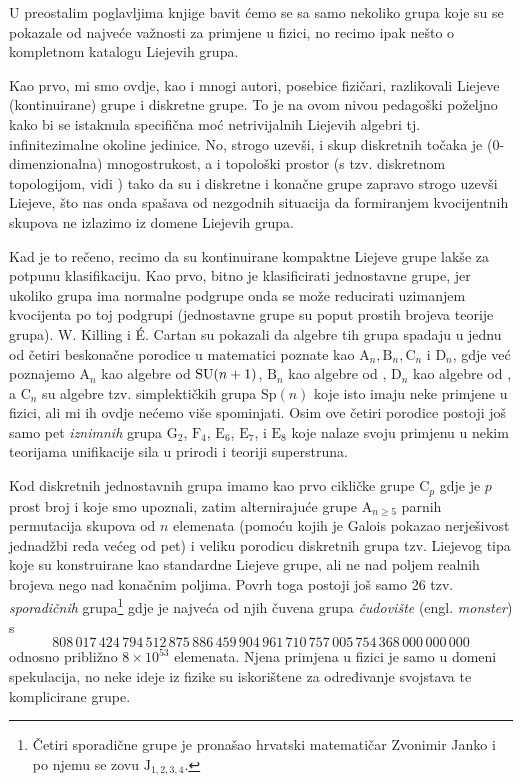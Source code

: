 U preostalim poglavljima knjige bavit ćemo se sa samo nekoliko grupa
koje su se pokazale od najveće važnosti za primjene u fizici, no recimo
ipak nešto o kompletnom katalogu Liejevih grupa.

Kao prvo, mi smo ovdje, kao i mnogi autori, posebice fizičari, razlikovali
Liejeve (kontinuirane) grupe i diskretne grupe. To je na ovom nivou pedagoški
poželjno kako bi se istaknula specifična moć netrivijalnih Liejevih algebri tj. infinitezimalne
okoline jedinice. No, strogo uzevši, i skup diskretnih točaka je
(0-dimenzionalna) mnogostrukost, a i topološki prostor (s tzv. 
diskretnom topologijom, vidi \cite{Smolic:2024}) tako da su i diskretne
i konačne grupe zapravo strogo uzevši Liejeve, što nas onda spašava od
nezgodnih situacija da formiranjem kvocijentnih skupova ne izlazimo
iz domene Liejevih grupa.

Kad je to rečeno, recimo da su kontinuirane kompaktne Liejeve grupe
lakše za potpunu klasifikaciju. Kao prvo,
bitno je klasificirati jednostavne grupe, jer ukoliko grupa ima normalne
podgrupe onda se može reducirati uzimanjem kvocijenta po toj podgrupi
(jednostavne grupe su poput prostih brojeva teorije grupa). W. Killing i \'{E}. Cartan
su pokazali da algebre tih grupa spadaju u jednu od četiri beskonačne 
porodice u matematici poznate kao $\mathrm{A}_n, \mathrm{B}_n, \mathrm{C}_n$
i $\mathrm{D}_n$, gdje već poznajemo
$\mathrm{A}_n$ kao algebre od $\mathrm{SU}(n+1)$,  $\mathrm{B}_n$ kao algebre od ,
$\mathrm{D}_n$ kao algebre od , a $\mathrm{C}_n$ su algebre tzv. simplektičkih grupa
$\mathrm{Sp}(n)$ koje isto imaju neke primjene u fizici, ali mi ih ovdje
nećemo više spominjati. Osim ove četiri porodice postoji još samo
pet \emph{iznimnih} grupa $\mathrm{G}_2$, $\mathrm{F}_4$,
$\mathrm{E}_6$, $\mathrm{E}_7$, i $\mathrm{E}_8$ koje nalaze svoju primjenu
u nekim teorijama unifikacije sila u prirodi i teoriji superstruna.

Kod diskretnih jednostavnih grupa imamo kao prvo cikličke grupe $\mathrm{C}_{p}$
gdje je $p$ prost broj i koje smo upoznali, 
zatim alternirajuće grupe $\mathrm{A}_{n\ge 5}$ parnih permutacija skupova
od $n$ elemenata (pomoću kojih je Galois pokazao nerješivost jednadžbi
reda većeg od pet) i
veliku porodicu diskretnih grupa tzv. Liejevog tipa koje su konstruirane
kao standardne Liejeve grupe, ali ne nad poljem realnih brojeva nego
nad konačnim poljima. Povrh toga postoji još samo 26 tzv. \emph{sporadičnih}
grupa\footnote{Četiri sporadične grupe je pronašao hrvatski matematičar Zvonimir Janko
i po njemu se zovu $\mathrm{J}_{1, 2, 3, 4}$.} gdje je najveća od njih
čuvena grupa \emph{čudovište} (engl. \emph{monster}) s
\[ \textstyle
808\,017\,424\,794\,512\,875\,886\,459\,904\,961\,710\,757\,005\,754\,368\,000\,000\,000
\]
odnosno približno $8\times 10^{53}$ elemenata. Njena primjena u fizici je samo u domeni spekulacija, no
neke ideje iz fizike su iskorištene za određivanje svojstava te komplicirane
grupe.




